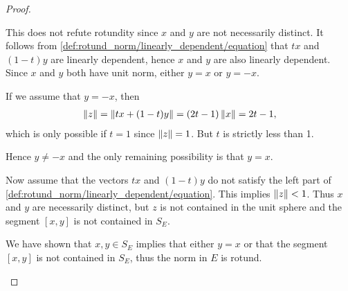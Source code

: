 \begin{proof}
\begin{description}
    This does not refute rotundity since \( x \) and \( y \) are not necessarily distinct. It follows from \cref{def:rotund_norm/linearly_dependent/equation} that \( tx \) and \( (1-t)y \) are linearly dependent, hence \( x \) and \( y \) are also linearly dependent. Since \( x \) and \( y \) both have unit norm, either \( y = x \) or \( y = -x \).

    If we assume that \( y = -x \), then
    \begin{align*}
      \left\Vert z \right\Vert
      =
      \left\Vert tx + (1-t)y \right\Vert
      =
      (2t - 1) \left\Vert x \right\Vert
      =
      2t - 1,
    \end{align*}
    which is only possible if \( t = 1 \) since \( \left\Vert z \right\Vert = 1 \). But \( t \) is strictly less than 1.

    Hence \( y \neq -x \) and the only remaining possibility is that \( y = x \).

    Now assume that the vectors \( tx \) and \( (1-t)y \) do not satisfy the left part of \cref{def:rotund_norm/linearly_dependent/equation}. This implies \( \left\Vert z \right\Vert < 1 \). Thus \( x \) and \( y \) are necessarily distinct, but \( z \) is not contained in the unit sphere and the segment \( [x, y] \) is not contained in \( S_E \).

    We have shown that \( x, y \in S_E \) implies that either \( y = x \) or that the segment \( [x, y] \) is not contained in \( S_E \), thus the norm in \( E \) is rotund.
  \end{description}
\end{proof}

